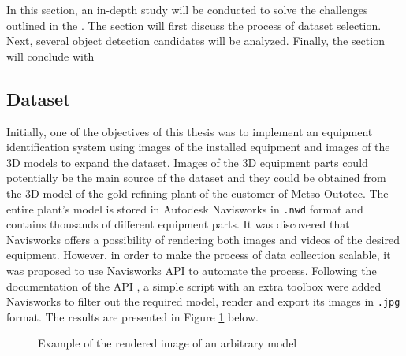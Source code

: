 \documentclass[english, 12pt, a4paper, elec, utf8, a-1b, online]{aaltothesis}
\begin{document}
In this section, an in-depth study will be conducted to solve the challenges outlined in the . The section will first discuss the process of dataset selection. Next, several object detection candidates will be analyzed. Finally, the section will conclude with 

\subsection{Dataset}

Initially, one of the objectives of this thesis was to implement an equipment identification system using images of the installed equipment and images of the 3D models to expand the dataset. Images of the 3D equipment parts could potentially be the main source of the dataset and they could be obtained from the 3D model of the gold refining plant of the customer of Metso Outotec. The entire plant's model is stored in Autodesk Navisworks in \texttt{.nwd} format and contains thousands of different equipment parts. It was discovered that Navisworks offers a possibility of rendering both images and videos of the desired equipment. However, in order to make the process of data collection scalable, it was proposed to use Navisworks API to automate the process. Following the documentation of the API \cite{navisworks}, a simple script with an extra toolbox were added Navisworks to filter out the required model, render and export its images in \texttt{.jpg} format. The results are presented in Figure \ref{navisworks} below.

\begin{figure}[htb]
    \centering
    \qquad
    \caption{Example of the rendered image of an arbitrary model}
    \label{navisworks}%
\end{figure}
\FloatBarrier
\end{document}
